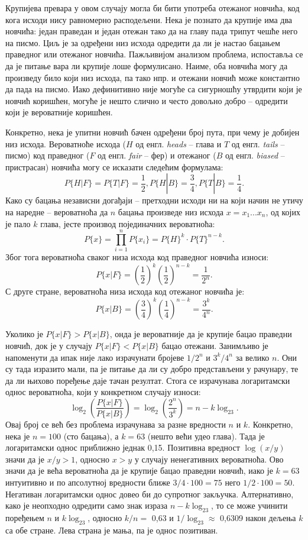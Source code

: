 \documentclass[12pt,oneside]{memoir}
\begin{document}
\begin{CJK}{UTF8}{ipxm}
Крупијева превара у овом случају могла би бити употреба отежаног новчића, код кога исходи нису равномерно расподељени. Нека је познато да крупије има два новчића: један праведан и један отежан тако да на главу пада трипут чешће него на писмо. Циљ је за одређени низ исхода одредити да ли је настао бацањем праведног или отежаног новчића. Пажљивијом анализом проблема, испоставља се да је питање вара ли крупије лоше формулисано. Наиме, оба новчића могу да произведу било који низ исхода, па тако нпр. и отежани новчић може константно да пада на писмо. Иако дефинитивно није могуће са сигурношћу утврдити који је новчић коришћен, могуће је нешто слично и често довољно добро -- одредити који је вероватније коришћен.

Конкретно, нека је упитни новчић бачен одређени број пута, при чему је добијен низ исхода. Вероватноће исхода ($H$ од енгл. \textit{heads} -- глава и $T$ од енгл. \textit{tails} -- писмо) код праведног ($F$ од енгл. \textit{fair} -- фер) и отежаног ($B$ од енгл. \textit{biased} -- пристрасан) новчића могу се исказати следећим формулама: $$P\{H | F\} = P\{T | F\} = \frac{1}{2}, P\{H | B\} = \frac{3}{4}, P\{T | B\} = \frac{1}{4}.$$ Како су бацања независни догађаји -- претходни исходи ни на који начин не утичу на наредне -- вероватноћа да $n$ бацања произведе низ исхода $x = x_1...x_n$, од којих је пало $k$ глава, јесте производ појединачних вероватноћа: $$P\{x\} = \prod_{i=1}^n P\{x_i\} = P\{H\}^k \cdot P\{T\}^{n-k}.$$ Због тога вероватноћа сваког низа исхода код праведног новчића износи: $$P\{x | F\} = \left(\frac{1}{2}\right)^k \left(\frac{1}{2}\right)^{n-k} = \frac{1}{2^n}.$$ С друге стране, вероватноћа низа исхода код отежаног новчића је: $$P\{x | B\} = \left(\frac{3}{4}\right)^k \left(\frac{1}{4}\right)^{n-k} = \frac{3^k}{4^n}.$$

Уколико је $P\{x | F\} > P\{x | B\}$, онда је вероватније да је крупије бацао праведни новчић, док је у случају $P\{x | F\} < P\{x | B\}$ бацао отежани. Занимљиво је напоменути да ипак није лако израчунати бројеве $1/2^n$ и $3^k/4^n$ за велико $n$. Они су тада изразито мали, па је питање да ли су добро представљени у рачунару, те да ли њихово поређење даје тачан резултат. Стога се израчунава логаритамски однос вероватноћа, који у конкретном случају износи: $$\log_2\left(\frac{P\{x | F\}}{P\{x | B\}}\right) = \log_2\left(\frac{2^n}{3^k}\right) = n - k\log_23.$$ Овај број се већ без проблема израчунава за разне вредности $n$ и $k$. Конкретно, нека је $n = 100$ (сто бацања), а $k = 63$ (нешто већи удео глава). Тада је логаритамски однос приближно једнак 0,15. Позитивна вредност $\log(x/y)$ значи да је $x/y > 1$, односно $x > y$ у случају ненегативних вероватноћа. Ово значи да је већа вероватноћа да је крупије бацао праведни новчић, иако је $k = 63$ интуитивно и по апсолутној вредности ближе $3/4 \cdot 100 = 75$ него $1/2 \cdot 100 = 50$. Негативан логаритамски однос довео би до супротног закључка. Алтернативно, како је неопходно одредити само знак израза $n - k\log_23$, то се може учинити поређењем $n$ и $k\log_23$, односно $k/n =$ 0,63 и $1/\log_23 \approx$ 0,6309 након дељења $k$ са обе стране. Лева страна је мања, па је однос позитиван.


\end{CJK}
\end{document}
